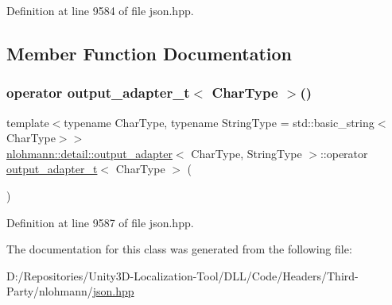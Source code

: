 Definition at line 9584 of file json.\+hpp.



\subsection{Member Function Documentation}
\mbox{\label{classnlohmann_1_1detail_1_1output__adapter_a5fdac7aec8ade2f4bb0b5df30550d90c}} 
\subsubsection{\texorpdfstring{operator output\_adapter\_t$<$ CharType $>$()}{operator output\_adapter\_t< CharType >()}}
{\footnotesize\ttfamily template$<$typename Char\+Type, typename String\+Type = std\+::basic\+\_\+string$<$\+Char\+Type$>$$>$ \\
\mbox{\hyperlink{classnlohmann_1_1detail_1_1output__adapter}{nlohmann\+::detail\+::output\+\_\+adapter}}$<$ Char\+Type, String\+Type $>$\+::operator \mbox{\hyperlink{namespacenlohmann_1_1detail_a9b680ddfb58f27eb53a67229447fc556}{output\+\_\+adapter\+\_\+t}}$<$ Char\+Type $>$ (\begin{DoxyParamCaption}{ }\end{DoxyParamCaption})\hspace{0.3cm}{\ttfamily [inline]}}



Definition at line 9587 of file json.\+hpp.



The documentation for this class was generated from the following file\+:\begin{DoxyCompactItemize}
\item 
D\+:/\+Repositories/\+Unity3\+D-\/\+Localization-\/\+Tool/\+D\+L\+L/\+Code/\+Headers/\+Third-\/\+Party/nlohmann/\mbox{\hyperlink{json_8hpp}{json.\+hpp}}\end{DoxyCompactItemize}
